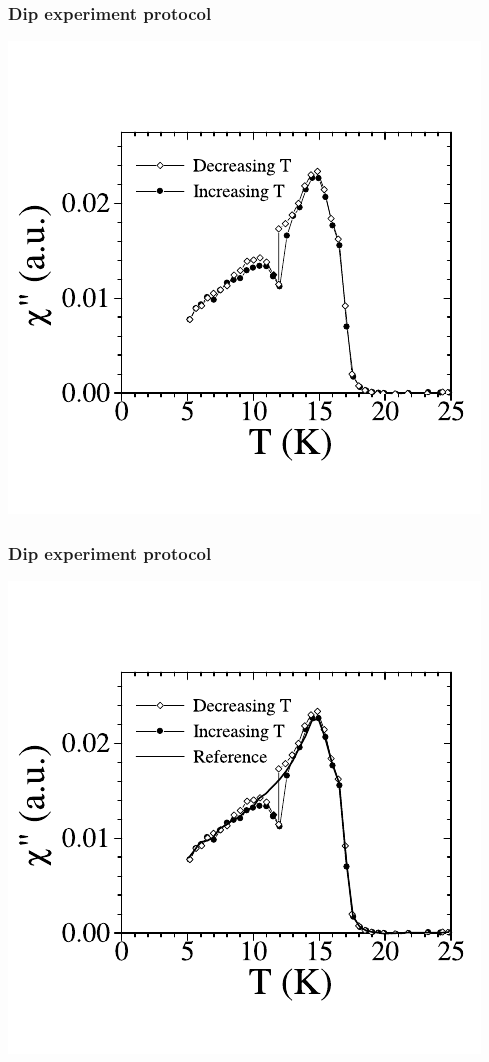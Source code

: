 \documentclass{beamer}
\begin{document}
\begin{frame}
  \frametitle{Dip experiment protocol}
  \begin{center}
    \includegraphics{images/dip_noref.pdf}
  \end{center}
\end{frame}

\begin{frame}
  \frametitle{Dip experiment protocol}
  \begin{center}
    \includegraphics{images/dip_abridged.pdf}
  \end{center}
\end{frame}
\end{document}
